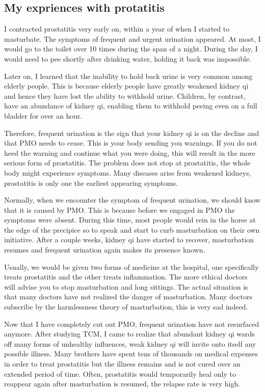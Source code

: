 \documentclass[
]{book}
\begin{document}
\hypertarget{my-expriences-with-protatitis}{%
\subsection{My expriences with protatitis}\label{my-expriences-with-protatitis}}

I contracted prostatitis very early on, within a year of when I started to masturbate. The symptoms of frequent and urgent urination appeared. At most, I would go to the toilet over 10 times during the span of a night. During the day, I would need to pee shortly after drinking water, holding it back was impossible.

Later on, I learned that the inability to hold back urine is very common among elderly people. This is because elderly people have greatly weakened kidney qi and hence they have lost the ability to withhold urine. Children, by contrast, have an abundance of kidney qi, enabling them to withhold peeing even on a full bladder for over an hour.

Therefore, frequent urination is the sign that your kidney qi is on the decline and that PMO needs to cease. This is your body sending you warnings. If you do not heed the warning and continue what you were doing, this will result in the more serious form of prostatitis. The problem does not stop at prostatitis, the whole body might experience symptoms. Many diseases arise from weakened kidneys, prostatitis is only one the earliest appearing symptoms.

Normally, when we encounter the symptom of frequent urination, we should know that it is caused by PMO. This is because before we engaged in PMO the symptoms were absent. During this time, most people would rein in the horse at the edge of the precipice so to speak and start to curb masturbation on their own initiative. After a couple weeks, kidney qi have started to recover, masturbation resumes and frequent urination again makes its presence known.

Usually, we would be given two forms of medicine at the hospital, one specifically treats prostatitis and the other treats inflammation. The more ethical doctors will advise you to stop masturbation and long sittings. The actual situation is that many doctors have not realized the danger of masturbation. Many doctors subscribe by the harmlessness theory of masturbation, this is very sad indeed.

Now that I have completely cut out PMO, frequent urination have not resurfaced anymore. After studying TCM, I came to realize that abundant kidney qi wards off many forms of unhealthy influences, weak kidney qi will invite onto itself any possible illness. Many brothers have spent tens of thousands on medical expenses in order to treat prostatitis but the illness remains and is not cured over an extended period of time. Often, prostatitis would temporarily heal only to reappear again after masturbation is resumed, the relapse rate is very high.
\end{document}

